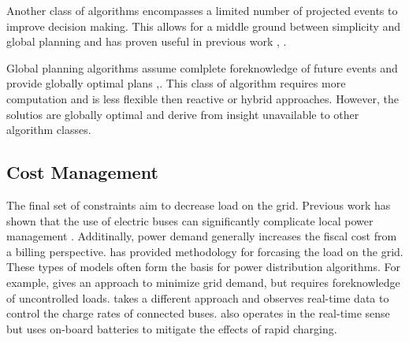 \par Another class of algorithms encompasses a limited number of projected events to improve decision making. This allows for a middle ground between simplicity and global planning and has proven useful in previous work \cite{jahic_preemptive_2019}, \cite{bagherinezhad_spatio-temporal_2020}.
\par Global planning algorithms assume comlplete foreknowledge of future events and provide globally optimal plans \cite{whitaker_network_2021},\cite{el-taweel_incorporation_2019}. This class of algorithm requires more computation and is less flexible then reactive or hybrid approaches. However, the solutios are globally optimal and derive from insight unavailable to other algorithm classes.
\subsection{Cost Management}
The final set of constraints aim to decrease load on the grid.  Previous work has shown that the use of electric buses can significantly complicate local power management \cite{boonraksa_impact_2019} \cite{deb_impact_2017}. Additinally, power demand generally increases the fiscal cost from a billing perspective.  \cite{gao_charging_2019} has provided methodology for forcasing the load on the grid.  These types of models often form the basis for power distribution algorithms.  For example, \cite{qin_numerical_2016} gives an approach to minimize grid demand, but requires foreknowledge of uncontrolled loads. \cite{cheng_smart_2020} takes a different approach and observes real-time data to control the charge rates of connected buses.  \cite{ojer_development_2020} also operates in the real-time sense but uses on-board batteries to mitigate the effects of rapid charging.  

